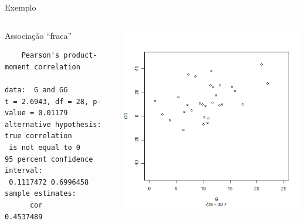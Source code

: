 \documentclass{beamer}
\begin{document}
\begin{frame}[fragile]{\scriptsize Exemplo}
  \begin{columns}
    \begin{column}{6cm}
      \begin{exampleblock}{Associação ``fraca''}
        \tiny
\begin{verbatim}
	Pearson's product-moment correlation

data:  G and GG
t = 2.6943, df = 28, p-value = 0.01179
alternative hypothesis: true correlation
 is not equal to 0
95 percent confidence interval:
 0.1117472 0.6996458
sample estimates:
      cor 
0.4537489
\end{verbatim}
    \end{exampleblock}
   \end{column}
    \begin{column}{4cm}
  \begin{center}
    \includegraphics[height=.8\textheight]{Cap17/anim-3}
  \end{center}
    \end{column}
\end{columns}
\end{frame}
\end{document}
